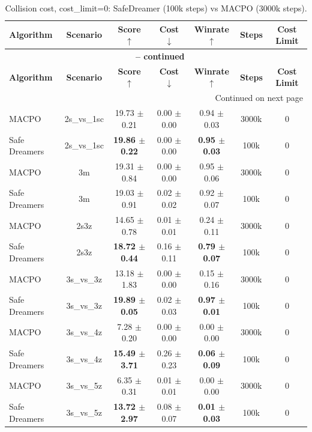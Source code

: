 \documentclass{article}
\begin{document}
\begin{longtable}{lcccccc}
\caption{Collision cost, cost\_limit=0: SafeDreamer (100k steps) vs MACPO (3000k steps).}\\
\toprule
\textbf{Algorithm} & \textbf{Scenario} & \textbf{Score} $\uparrow$ & \textbf{Cost} $\downarrow$ & \textbf{Winrate} $\uparrow$ & \textbf{Steps} & \textbf{Cost Limit} \\
\midrule
\endfirsthead
\multicolumn{7}{c}{{\bfseries \tablename\ \thetable{} -- continued}} \\
\toprule
\textbf{Algorithm} & \textbf{Scenario} & \textbf{Score} $\uparrow$ & \textbf{Cost} $\downarrow$ & \textbf{Winrate} $\uparrow$ & \textbf{Steps} & \textbf{Cost Limit} \\
\midrule
\endhead
\midrule \multicolumn{7}{r}{{Continued on next page}} \\
\endfoot
\bottomrule
\endlastfoot
MACPO & 2s\_vs\_1sc & 19.73 $\pm$ 0.21 & 0.00 $\pm$ 0.00 & 0.94 $\pm$ 0.03 & 3000k & 0 \\
Safe Dreamers & 2s\_vs\_1sc & \textbf{19.86 $\pm$ 0.22} & 0.00 $\pm$ 0.00 & \textbf{0.95 $\pm$ 0.03} & 100k & 0 \\
\midrule
MACPO & 3m & 19.31 $\pm$ 0.84 & 0.00 $\pm$ 0.00 & 0.95 $\pm$ 0.06 & 3000k & 0 \\
Safe Dreamers & 3m & 19.03 $\pm$ 0.91 & 0.02 $\pm$ 0.02 & 0.92 $\pm$ 0.07 & 100k & 0 \\
\midrule
MACPO & 2s3z & 14.65 $\pm$ 0.78 & 0.01 $\pm$ 0.01 & 0.24 $\pm$ 0.11 & 3000k & 0 \\
Safe Dreamers & 2s3z & \textbf{18.72 $\pm$ 0.44} & 0.16 $\pm$ 0.11 & \textbf{0.79 $\pm$ 0.07} & 100k & 0 \\
\midrule
MACPO & 3s\_vs\_3z & 13.18 $\pm$ 1.83 & 0.00 $\pm$ 0.00 & 0.15 $\pm$ 0.16 & 3000k & 0 \\
Safe Dreamers & 3s\_vs\_3z & \textbf{19.89 $\pm$ 0.05} & 0.02 $\pm$ 0.03 & \textbf{0.97 $\pm$ 0.01} & 100k & 0 \\
\midrule
MACPO & 3s\_vs\_4z & 7.28 $\pm$ 0.20 & 0.00 $\pm$ 0.00 & 0.00 $\pm$ 0.00 & 3000k & 0 \\
Safe Dreamers & 3s\_vs\_4z & \textbf{15.49 $\pm$ 3.71} & 0.26 $\pm$ 0.23 & \textbf{0.06 $\pm$ 0.09} & 100k & 0 \\
\midrule
MACPO & 3s\_vs\_5z & 6.35 $\pm$ 0.31 & 0.01 $\pm$ 0.01 & 0.00 $\pm$ 0.00 & 3000k & 0 \\
Safe Dreamers & 3s\_vs\_5z & \textbf{13.72 $\pm$ 2.97} & 0.08 $\pm$ 0.07 & \textbf{0.01 $\pm$ 0.03} & 100k & 0 \\

\end{longtable}
\end{document}
